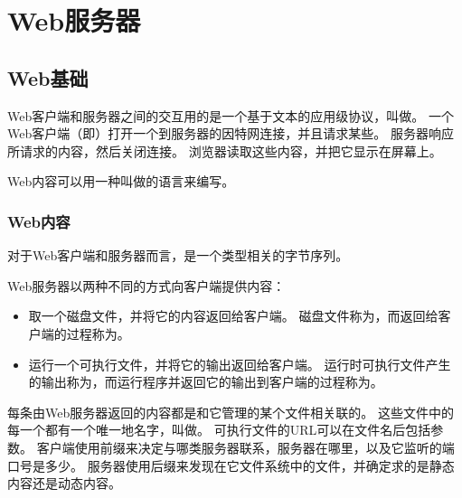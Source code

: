 
\section{Web服务器}
{
    \subsection{Web基础}
    {
        Web客户端和服务器之间的交互用的是一个基于文本的应用级协议，叫做。
        一个Web客户端（即）打开一个到服务器的因特网连接，并且请求某些。
        服务器响应所请求的内容，然后关闭连接。
        浏览器读取这些内容，并把它显示在屏幕上。

        Web内容可以用一种叫做的语言来编写。
    }

    \subsubsection{Web内容}
    {
        对于Web客户端和服务器而言，是一个类型相关的字节序列。

        Web服务器以两种不同的方式向客户端提供内容：

        \begin{itemize}
            \item
            {
                取一个磁盘文件，并将它的内容返回给客户端。
                磁盘文件称为，而返回给客户端的过程称为。
            }
            \item
            {
                运行一个可执行文件，并将它的输出返回给客户端。
                运行时可执行文件产生的输出称为，而运行程序并返回它的输出到客户端的过程称为。
            }
        \end{itemize}

        每条由Web服务器返回的内容都是和它管理的某个文件相关联的。
        这些文件中的每一个都有一个唯一地名字，叫做。
        可执行文件的URL可以在文件名后包括参数。
        客户端使用前缀来决定与哪类服务器联系，服务器在哪里，以及它监听的端口号是多少。
        服务器使用后缀来发现在它文件系统中的文件，并确定求的是静态内容还是动态内容。
    }

}
